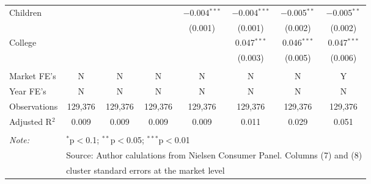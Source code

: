 \begin{table}[!htbp]
\begin{tabular}{@{\extracolsep{5pt}}lccccccc}
  Children &  &  &  & $-$0.004$^{***}$ & $-$0.004$^{***}$ & $-$0.005$^{**}$ & $-$0.005$^{**}$ \\ 
  &  &  &  & (0.001) & (0.001) & (0.002) & (0.002) \\ 
  College &  &  &  &  & 0.047$^{***}$ & 0.046$^{***}$ & 0.047$^{***}$ \\ 
  &  &  &  &  & (0.003) & (0.005) & (0.006) \\ 
 \hline \\[-1.8ex] 
Market FE's & N & N & N & N & N & N & Y \\ 
Year FE's & N & N & N & N & N & N & N \\ 
Observations & 129,376 & 129,376 & 129,376 & 129,376 & 129,376 & 129,376 & 129,376 \\ 
Adjusted R$^{2}$ & 0.009 & 0.009 & 0.009 & 0.009 & 0.011 & 0.029 & 0.051 \\ 
\hline 
\hline \\[-1.8ex] 
\textit{Note:}  & \multicolumn{7}{l}{$^{*}$p$<$0.1; $^{**}$p$<$0.05; $^{***}$p$<$0.01} \\ 
 & \multicolumn{7}{l}{Source: Author calulations from Nielsen Consumer Panel. Columns (7) and (8) } \\ 
 & \multicolumn{7}{l}{cluster standard errors at the market level} \\ 
\end{tabular} 
\end{table} 
